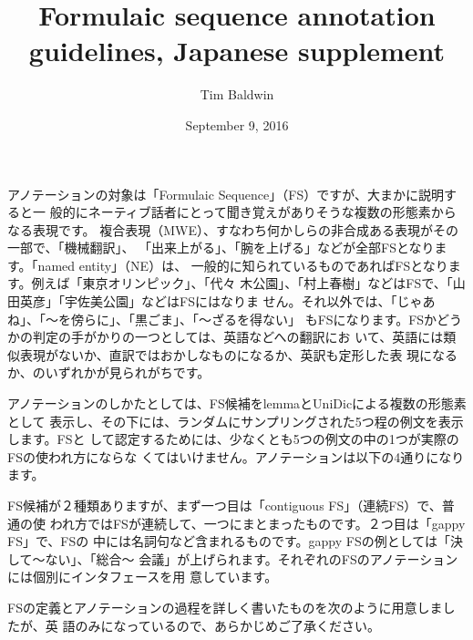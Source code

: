 \documentclass[12pt,letterpaper]{article}
\title{Formulaic sequence annotation guidelines, Japanese supplement}
\author{Tim Baldwin}
\date{September 9, 2016}
\begin{document}
\maketitle

\begin{CJK*}{UTF8}{min}
アノテーションの対象は「Formulaic Sequence」（FS）ですが、大まかに説明すると一
般的にネーティブ話者にとって聞き覚えがありそうな複数の形態素からなる表現です。
複合表現（MWE）、すなわち何かしらの非合成ある表現がその一部で、「機械翻訳」、
「出来上がる」、「腕を上げる」などが全部FSとなります。「named entity」（NE）は、
一般的に知られているものであればFSとなります。例えば「東京オリンピック」、「代々
木公園」、「村上春樹」などはFSで、「山田英彦」「宇佐美公園」などはFSにはなりま
せん。それ以外では、「じゃあね」、「〜を傍らに」、「黒ごま」、「〜ざるを得ない」
もFSになります。FSかどうかの判定の手がかりの一つとしては、英語などへの翻訳にお
いて、英語には類似表現がないか、直訳ではおかしなものになるか、英訳も定形した表
現になるか、のいずれかが見られがちです。
\end{CJK*} 

\begin{CJK*}{UTF8}{min}
アノテーションのしかたとしては、FS候補をlemmaとUniDicによる複数の形態素として
表示し、その下には、ランダムにサンプリングされた5つ程の例文を表示します。FSと
して認定するためには、少なくとも5つの例文の中の1つが実際のFSの使われ方にならな
くてはいけません。アノテーションは以下の4通りになります。
\end{CJK*} 


\begin{CJK*}{UTF8}{min}
FS候補が２種類ありますが、まず一つ目は「contiguous FS」（連続FS）で、普通の使
われ方ではFSが連続して、一つにまとまったものです。２つ目は「gappy FS」で、FSの
中には名詞句など含まれるものです。gappy FSの例としては「決して〜ない」、「総合～
会議」が上げられます。それぞれのFSのアノテーションには個別にインタフェースを用
意しています。
\end{CJK*}

\begin{CJK*}{UTF8}{min}
FSの定義とアノテーションの過程を詳しく書いたものを次のように用意しましたが、英
語のみになっているので、あらかじめご了承ください。
\end{CJK*}
\end{document}
